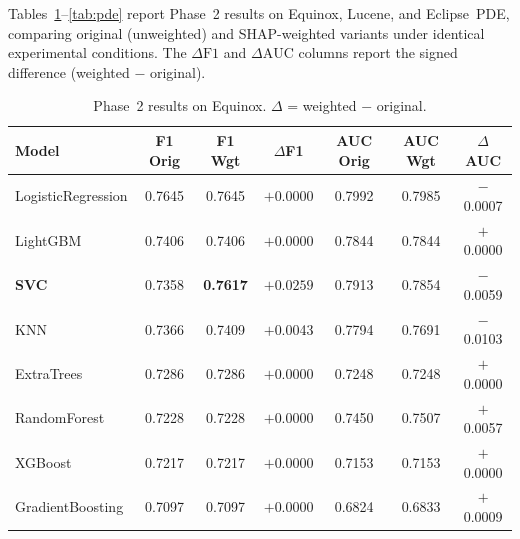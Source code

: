 \documentclass[12pt, a4paper]{article}
\begin{document}
Tables~\ref{tab:equinox}--\ref{tab:pde} report Phase~2 results on Equinox,
Lucene, and Eclipse~PDE, comparing original (unweighted) and SHAP-weighted
variants under identical experimental conditions. The $\Delta\text{F1}$ and
$\Delta\text{AUC}$ columns report the signed difference (weighted $-$ original).

\begin{table}[H]
\caption{Phase~2 results on Equinox. $\Delta$ = weighted $-$ original.}
\label{tab:equinox}
\centering
\small
\renewcommand{\arraystretch}{1.2}
\begin{tabular}{@{}lcccccc@{}}
\toprule
\textbf{Model}
  & \textbf{F1 Orig} & \textbf{F1 Wgt} & \textbf{$\Delta$F1}
  & \textbf{AUC Orig} & \textbf{AUC Wgt} & \textbf{$\Delta$AUC} \\
\midrule
LogisticRegression & 0.7645 & 0.7645 & $+$0.0000 & 0.7992 & 0.7985 & $-$0.0007 \\
LightGBM           & 0.7406 & 0.7406 & $+$0.0000 & 0.7844 & 0.7844 & $+$0.0000 \\
\textbf{SVC}       & 0.7358 & \textbf{0.7617} & $\mathbf{+0.0259}$
                   & 0.7913 & 0.7854 & $-$0.0059 \\
KNN                & 0.7366 & 0.7409 & $+$0.0043 & 0.7794 & 0.7691 & $-$0.0103 \\
ExtraTrees         & 0.7286 & 0.7286 & $+$0.0000 & 0.7248 & 0.7248 & $+$0.0000 \\
RandomForest       & 0.7228 & 0.7228 & $+$0.0000 & 0.7450 & 0.7507 & $+$0.0057 \\
XGBoost            & 0.7217 & 0.7217 & $+$0.0000 & 0.7153 & 0.7153 & $+$0.0000 \\
GradientBoosting   & 0.7097 & 0.7097 & $+$0.0000 & 0.6824 & 0.6833 & $+$0.0009 \\
\bottomrule
\end{tabular}
\end{table}
\end{document}
